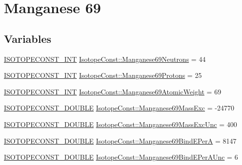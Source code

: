 \hypertarget{group___isotope_const-_manganese-_mn69}{}\section{Manganese 69}
\label{group___isotope_const-_manganese-_mn69}
\subsection*{Variables}
\begin{DoxyCompactItemize}
\item 
\mbox{\hyperlink{group___isotope_const-_macros_ga5f18360b3e99483a35c32d789e62621c}{I\+S\+O\+T\+O\+P\+E\+C\+O\+N\+S\+T\+\_\+\+I\+NT}} \mbox{\hyperlink{group___isotope_const-_manganese-_mn69_gac47ff05cfd9869512fabb56941441e6d}{Isotope\+Const\+::\+Manganese69\+Neutrons}} = 44
\item 
\mbox{\hyperlink{group___isotope_const-_macros_ga5f18360b3e99483a35c32d789e62621c}{I\+S\+O\+T\+O\+P\+E\+C\+O\+N\+S\+T\+\_\+\+I\+NT}} \mbox{\hyperlink{group___isotope_const-_manganese-_mn69_ga55797a6c95f25e5259a55961a69c1ad5}{Isotope\+Const\+::\+Manganese69\+Protons}} = 25
\item 
\mbox{\hyperlink{group___isotope_const-_macros_ga5f18360b3e99483a35c32d789e62621c}{I\+S\+O\+T\+O\+P\+E\+C\+O\+N\+S\+T\+\_\+\+I\+NT}} \mbox{\hyperlink{group___isotope_const-_manganese-_mn69_ga0e0b094f9989e927014d5a8aac2c3eee}{Isotope\+Const\+::\+Manganese69\+Atomic\+Weight}} = 69
\item 
\mbox{\hyperlink{group___isotope_const-_macros_ga8f45a7272ce02c0b4c65c44636ed719a}{I\+S\+O\+T\+O\+P\+E\+C\+O\+N\+S\+T\+\_\+\+D\+O\+U\+B\+LE}} \mbox{\hyperlink{group___isotope_const-_manganese-_mn69_ga2a4f4cb2d435978bd4f5e0dd3291a67d}{Isotope\+Const\+::\+Manganese69\+Mass\+Exc}} = -\/24770
\item 
\mbox{\hyperlink{group___isotope_const-_macros_ga8f45a7272ce02c0b4c65c44636ed719a}{I\+S\+O\+T\+O\+P\+E\+C\+O\+N\+S\+T\+\_\+\+D\+O\+U\+B\+LE}} \mbox{\hyperlink{group___isotope_const-_manganese-_mn69_ga78988cc9c5000cd46580864c4aa011ec}{Isotope\+Const\+::\+Manganese69\+Mass\+Exc\+Unc}} = 400
\item 
\mbox{\hyperlink{group___isotope_const-_macros_ga8f45a7272ce02c0b4c65c44636ed719a}{I\+S\+O\+T\+O\+P\+E\+C\+O\+N\+S\+T\+\_\+\+D\+O\+U\+B\+LE}} \mbox{\hyperlink{group___isotope_const-_manganese-_mn69_ga6d4299a7dd7b284b16ac3cb52a43e964}{Isotope\+Const\+::\+Manganese69\+Bind\+E\+PerA}} = 8147
\item 
\mbox{\hyperlink{group___isotope_const-_macros_ga8f45a7272ce02c0b4c65c44636ed719a}{I\+S\+O\+T\+O\+P\+E\+C\+O\+N\+S\+T\+\_\+\+D\+O\+U\+B\+LE}} \mbox{\hyperlink{group___isotope_const-_manganese-_mn69_gab5309d27069d08cbe31bd6f7e54cc20e}{Isotope\+Const\+::\+Manganese69\+Bind\+E\+Per\+A\+Unc}} = 6

\end{DoxyCompactItemize}
